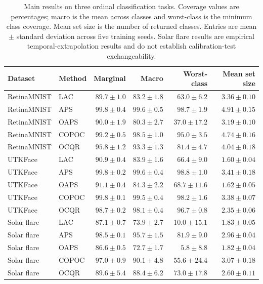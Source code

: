 \documentclass[12pt]{report}
\begin{document}
\begin{table}[htbp]
    \centering
    \small
    \caption{Main results on three ordinal classification tasks. Coverage values are percentages; macro is the mean across classes and worst-class is the minimum class coverage. Mean set size is the number of returned classes. Entries are mean $\pm$ standard deviation across five training seeds. Solar flare results are empirical temporal-extrapolation results and do not establish calibration-test exchangeability.}
    \label{tab:ocqr-preliminary-results}
    \begin{tabular}{llrrrr}
        \toprule
        Dataset & Method & Marginal & Macro & Worst-class & Mean set size \\
        \midrule
        RetinaMNIST & LAC   & $89.7 \pm 1.0$ & $83.2 \pm 1.8$ & $63.0 \pm 6.2$ & $3.36 \pm 0.10$ \\
        RetinaMNIST & APS   & $99.8 \pm 0.4$ & $99.6 \pm 0.5$ & $98.7 \pm 1.9$ & $4.91 \pm 0.15$ \\
        RetinaMNIST & OAPS  & $90.0 \pm 1.9$ & $80.3 \pm 2.7$ & $37.0 \pm 17.2$ & $3.19 \pm 0.10$ \\
        RetinaMNIST & COPOC & $99.2 \pm 0.5$ & $98.5 \pm 1.0$ & $95.0 \pm 3.5$ & $4.74 \pm 0.16$ \\
        RetinaMNIST & OCQR  & $95.8 \pm 1.2$ & $93.3 \pm 1.3$ & $81.4 \pm 4.7$ & $4.04 \pm 0.18$ \\
        \addlinespace
        UTKFace & LAC   & $90.9 \pm 0.4$ & $83.9 \pm 1.6$ & $66.4 \pm 9.0$ & $1.60 \pm 0.04$ \\
        UTKFace & APS   & $99.8 \pm 0.2$ & $99.6 \pm 0.4$ & $98.8 \pm 1.0$ & $3.41 \pm 0.18$ \\
        UTKFace & OAPS  & $91.1 \pm 0.4$ & $84.3 \pm 2.2$ & $68.7 \pm 11.6$ & $1.62 \pm 0.05$ \\
        UTKFace & COPOC & $99.8 \pm 0.1$ & $99.5 \pm 0.4$ & $98.2 \pm 1.6$ & $3.38 \pm 0.07$ \\
        UTKFace & OCQR  & $98.7 \pm 0.2$ & $98.1 \pm 0.4$ & $96.7 \pm 0.8$ & $2.35 \pm 0.06$ \\
        \addlinespace
        Solar flare & LAC   & $87.1 \pm 0.7$ & $73.9 \pm 2.7$ & $10.0 \pm 15.1$ & $1.83 \pm 0.05$ \\
        Solar flare & APS   & $98.5 \pm 0.1$ & $95.7 \pm 1.5$ & $81.9 \pm 9.0$ & $2.96 \pm 0.04$ \\
        Solar flare & OAPS  & $86.6 \pm 0.5$ & $72.7 \pm 1.7$ & $5.8 \pm 8.8$ & $1.82 \pm 0.04$ \\
        Solar flare & COPOC & $97.0 \pm 0.9$ & $90.1 \pm 4.8$ & $55.6 \pm 24.4$ & $3.07 \pm 0.18$ \\
        Solar flare & OCQR  & $89.6 \pm 5.4$ & $88.4 \pm 6.2$ & $73.0 \pm 17.8$ & $2.60 \pm 0.11$ \\
        \bottomrule
    \end{tabular}
\end{table}
\end{document}
